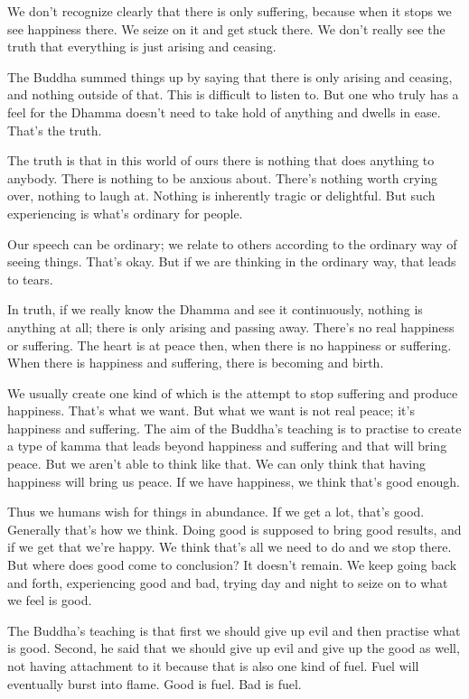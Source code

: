 We don't recognize clearly that there is only suffering, because when it stops we see happiness there. We seize on it and get stuck there. We don't really see the truth that everything is just arising and ceasing. 

The Buddha summed things up by saying that there is only arising and ceasing, and nothing outside of that. This is difficult to listen to. But one who truly has a feel for the Dhamma doesn't need to take hold of anything and dwells in ease. That's the truth. 

The truth is that in this world of ours there is nothing that does anything to anybody. There is nothing to be anxious about. There's nothing worth crying over, nothing to laugh at. Nothing is inherently tragic or delightful. But such experiencing is what's ordinary for people. 

Our speech can be ordinary; we relate to others according to the ordinary way of seeing things. That's okay. But if we are thinking in the ordinary way, that leads to tears. 

In truth, if we really know the Dhamma and see it continuously, nothing is anything at all; there is only arising and passing away. There's no real happiness or suffering. The heart is at peace then, when there is no happiness or suffering. When there is happiness and suffering, there is becoming and birth. 

We usually create one kind of  which is the attempt to stop suffering and produce happiness. That's what we want. But what we want is not real peace; it's happiness and suffering. The aim of the Buddha's teaching is to practise to create a type of kamma that leads beyond happiness and suffering and that will bring peace. But we aren't able to think like that. We can only think that having happiness will bring us peace. If we have happiness, we think that's good enough. 

Thus we humans wish for things in abundance. If we get a lot, that's good. Generally that's how we think. Doing good is supposed to bring good results, and if we get that we're happy. We think that's all we need to do and we stop there. But where does good come to conclusion? It doesn't remain. We keep going back and forth, experiencing good and bad, trying day and night to seize on to what we feel is good. 

The Buddha's teaching is that first we should give up evil and then practise what is good. Second, he said that we should give up evil and give up the good as well, not having attachment to it because that is also one kind of fuel. Fuel will eventually burst into flame. Good is fuel. Bad is fuel. 

